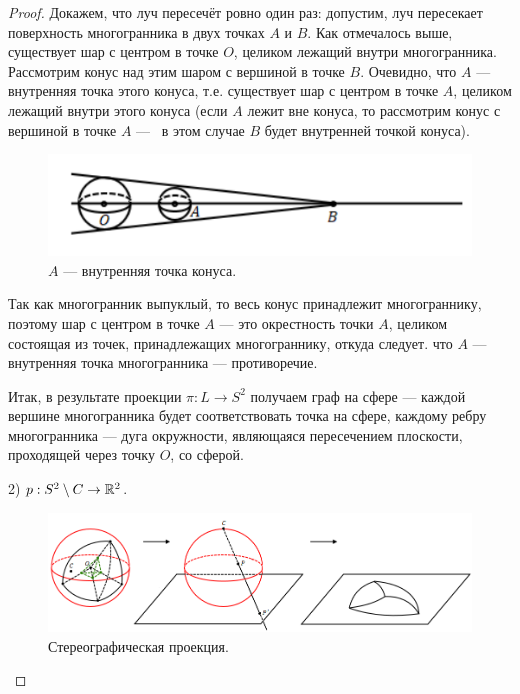 \begin{proof}
    Докажем, что луч пересечёт ровно один раз: допустим, луч пересекает поверхность многогранника в двух точках $A$ и $B$. Как отмечалось выше, существует шар с центром в точке $O$, целиком лежащий внутри многогранника. Рассмотрим конус над этим шаром с вершиной в точке $B$. Очевидно, что $A$ — внутренняя точка этого конуса, т.е. существует шар с центром в точке $A$, целиком лежащий внутри этого конуса (если $A$ лежит вне конуса, то рассмотрим конус с вершиной в точке $A$ —  в этом случае $B$ будет внутренней точкой конуса).

    \begin{figure}[h]
        \centering
        \includegraphics[scale=0.8]{images/c7.3.png}
        \caption{$A$ — внутренняя точка конуса.}
        \label{fig:c7.3}
    \end{figure}

    Так как многогранник выпуклый, то весь конус принадлежит многограннику, поэтому шар с центром в точке $A$ — это окрестность точки $A$, целиком состоящая из точек, принадлежащих многограннику, откуда следует. что $A$ — внутренняя точка многогранника — противоречие.

    Итак, в результате проекции $\pi: L \to S^2$ получаем граф на сфере — каждой вершине многогранника будет соответствовать точка на сфере, каждому ребру многогранника — дуга окружности, являющаяся пересечением плоскости, проходящей через точку $O$, со сферой.

    2) $p: S^2 \setminus C \to \mathbb{R}^2$.

    \begin{figure}[h]
        \centering
        \includegraphics[scale=0.5]{images/c7.4.png}
        \caption{Стереографическая проекция.}
        \label{fig:c7.4}
    \end{figure}


\end{proof}
